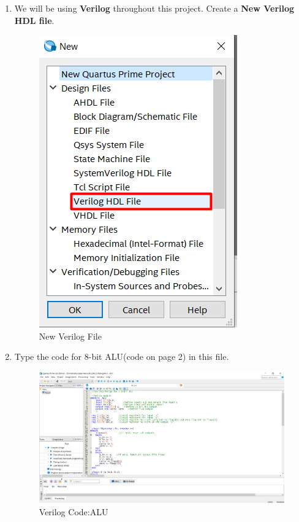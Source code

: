\documentclass[12pt,singleside,a4paper]{article}
\begin{document}
\begin{enumerate}
    \item We will be using \textbf{Verilog} throughout this project. Create a \textbf{New Verilog HDL file}.
    \begin{figure}[H]
        \centering
    \includegraphics[scale =0.8]{PROJIMG3.png}
    \caption{New Verilog File}
    \end{figure}
    \newpage
    \item Type the code for 8-bit ALU(code on page 2) in this file.
    \begin{figure}[H]
        \centering
    \includegraphics[width=14cm,keepaspectratio]{proentry.png}
    \caption{Verilog Code:ALU}
    \end{figure}
    

\end{enumerate}
\end{document}
